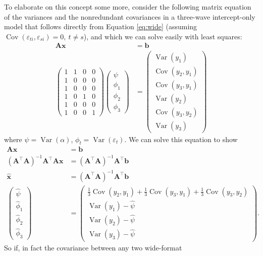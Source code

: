 \documentclass[]{interact}
\theoremstyle{plain}%
\theoremstyle{definition}
\theoremstyle{remark}
\begin{document}
To elaborate on this concept some more, consider the following matrix
equation of the variances and the nonredundant covariances in a
three-wave intercept-only model that follows directly from Equation
\eqref{eq:wide} (assuming
\(\mathop{\mathrm{\mathrm{Cov}}}(\varepsilon_{ti},\varepsilon_{si}) = 0, \ t \ne s\)),
and which we can solve easily with least squares: \begin{align}
\bm{A}\bm{x} & = \bm{b} \\
\begin{pmatrix}
1 & 1 & 0 & 0 \\
1 & 0 & 0 & 0 \\
1 & 0 & 0 & 0 \\
1 & 0 & 1 & 0 \\
1 & 0 & 0 & 0 \\
1 & 0 & 0 & 1
\end{pmatrix}
\begin{pmatrix}
\psi \\
\phi_{1} \\
\phi_{2} \\
\phi_{3}
\end{pmatrix} & = 
\begin{pmatrix}
\mathop{\mathrm{\mathrm{Var}}}(y_{1}) \\
\mathop{\mathrm{\mathrm{Cov}}}(y_{2},y_{1}) \\
\mathop{\mathrm{\mathrm{Cov}}}(y_{3},y_{1}) \\
\mathop{\mathrm{\mathrm{Var}}}(y_{2}) \\
\mathop{\mathrm{\mathrm{Cov}}}(y_{3},y_{2}) \\
\mathop{\mathrm{\mathrm{Var}}}(y_{3})
\end{pmatrix}
\end{align} where \(\psi = \mathop{\mathrm{\mathrm{Var}}}(\alpha)\),
\(\phi_{t} = \mathop{\mathrm{\mathrm{Var}}}(\varepsilon_{t})\). We can
solve this equation to show \begin{align}
\bm{A}\bm{x} & = \bm{b} \\
(\bm{A}^{\intercal}\bm{A})^{-1}\bm{A}^{\intercal}\bm{A}\bm{x} & = (\bm{A}^{\intercal}\bm{A})^{-1}\bm{A}^{\intercal}\bm{b} \\
\hat{\bm{x}} & = (\bm{A}^{\intercal}\bm{A})^{-1}\bm{A}^{\intercal}\bm{b} \\
\begin{pmatrix}
\hat{\psi} \\
\hat{\phi}_{1} \\
\hat{\phi}_{2} \\
\hat{\phi}_{3}
\end{pmatrix} & = 
\begin{pmatrix}
\frac{1}{3}\mathop{\mathrm{\mathrm{Cov}}}(y_{2},y_{1}) + \frac{1}{3}\mathop{\mathrm{\mathrm{Cov}}}(y_{3},y_{1}) + \frac{1}{3}\mathop{\mathrm{\mathrm{Cov}}}(y_{3},y_{2}) \\
\mathop{\mathrm{\mathrm{Var}}}(y_{1}) - \hat{\psi} \\
\mathop{\mathrm{\mathrm{Var}}}(y_{2}) - \hat{\psi} \\
\mathop{\mathrm{\mathrm{Var}}}(y_{3}) - \hat{\psi}
\end{pmatrix}.
\end{align} So if, in fact the covariance between any two wide-format
\end{document}
